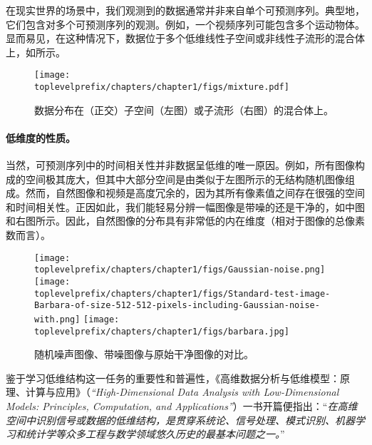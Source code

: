 \documentclass[../../book-main_zh.tex]{subfiles}
\begin{document}
在现实世界的场景中，我们观测到的数据通常并非来自单个可预测序列。典型地，它们包含对多个可预测序列的观测。例如，一个视频序列可能包含多个运动物体。显而易见，在这种情况下，数据位于多个低维线性子空间或非线性子流形的混合体上，如所示。
\begin{figure}
    \centering
    \texttt{[image: \\toplevelprefix/chapters/chapter1/figs/mixture.pdf]}
    \caption{数据分布在（正交）子空间（左图）或子流形（右图）的混合体上。}
    \label{fig:mixture-models}
\end{figure}

\paragraph{低维度的性质。}
当然，可预测序列中的时间相关性并非数据呈低维的唯一原因。例如，所有图像构成的空间极其庞大，但其中大部分空间是由类似于左图所示的无结构随机图像组成。然而，自然图像和视频是高度冗余的，因为其所有像素值之间存在很强的空间和时间相关性。正因如此，我们能轻易分辨一幅图像是带噪的还是干净的，如中图和右图所示。因此，自然图像的分布具有非常低的内在维度（相对于图像的总像素数而言）。

\begin{figure}
    \centering
    \texttt{[image: \\toplevelprefix/chapters/chapter1/figs/Gaussian-noise.png]}\hspace{2mm} 
    \texttt{[image: \\toplevelprefix/chapters/chapter1/figs/Standard-test-image-Barbara-of-size-512-512-pixels-including-Gaussian-noise-with.png]} \hspace{2mm} 
    \texttt{[image: \\toplevelprefix/chapters/chapter1/figs/barbara.jpg]}
    \caption{随机噪声图像、带噪图像与原始干净图像的对比。%
    }
    \label{fig:noise-image}
\end{figure}

鉴于学习低维结构这一任务的重要性和普遍性，《高维数据分析与低维模型：原理、计算与应用》（{\em ``High-Dimensional Data Analysis with Low-Dimensional Models: Principles, Computation, and Applications''}）\cite{Wright-Ma-2022}一书开篇便指出：``{\em 在高维空间中识别信号或数据的低维结构，是贯穿系统论、信号处理、模式识别、机器学习和统计学等众多工程与数学领域悠久历史的最基本问题之一。}''
\end{document}
